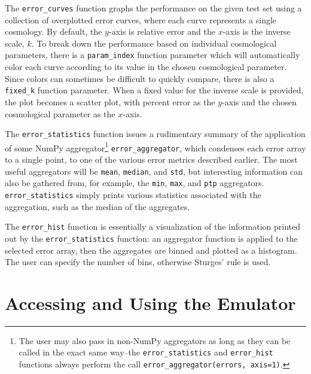 The \verb|error_curves| function graphs the performance on the given test set 
using a collection of overplotted error curves, where each curve represents a 
single cosmology. By default, the $y$-axis is relative error and the
$x$-axis is the inverse scale, $k$. To break down the performance based on 
individual cosmological parameters, there is a \verb|param_index| function
parameter which will automatically color each curve according to its value in 
the chosen cosmological parameter. Since colors can sometimes be difficult to 
quickly compare, there is also a \verb|fixed_k| function parameter. When a 
fixed value for the inverse scale is provided, the plot becomes a scatter 
plot, with percent error as the $y$-axis and the chosen cosmological parameter 
as the $x$-axis.


The \verb|error_statistics| function issues a rudimentary summary of the 
application of some NumPy aggregator\footnote{The user may also pass in
non-NumPy aggregators as long as they can be called in the exact same
way--the \verb|error_statistics| and \verb|error_hist| functions always
perform the call \verb|error_aggregator(errors, axis=1)|.}
\verb|error_aggregator|, which condenses each error array to a single point,
to one of the various error metrics described earlier. The 
most useful aggregators will be \verb|mean|, \verb|median|, and \verb|std|, 
but interesting information can also be gathered from, for example, the
\verb|min|, \verb|max|, and \verb|ptp| aggregators.
\verb|error_statistics| simply prints various statistics associated with the 
aggregation, such as the median of the aggregates.

The \verb|error_hist| function is essentially a visualization of the 
information printed out by the \verb|error_statistics| function: an aggregator
function is applied to the selected error array, then the aggregates are 
binned and plotted as a histogram. The user can specify the number of bins,
otherwise Sturges' rule is used.


\section{Accessing and Using the Emulator}


